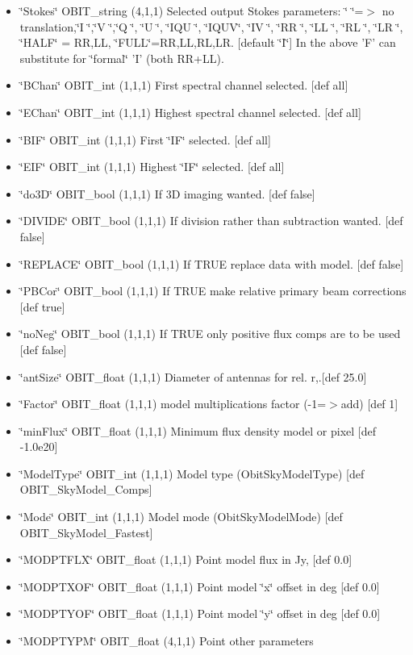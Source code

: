\begin{itemize}
\item \char`\"{}Stokes\char`\"{} OBIT\_\-string (4,1,1) Selected output Stokes parameters: \char`\"{}    \char`\"{}=$>$ no translation,\char`\"{}I   \char`\"{},\char`\"{}V   \char`\"{},\char`\"{}Q   \char`\"{}, \char`\"{}U   \char`\"{}, \char`\"{}IQU \char`\"{}, \char`\"{}IQUV\char`\"{}, \char`\"{}IV  \char`\"{}, \char`\"{}RR  \char`\"{}, \char`\"{}LL  \char`\"{}, \char`\"{}RL  \char`\"{}, \char`\"{}LR  \char`\"{}, \char`\"{}HALF\char`\"{} = RR,LL, \char`\"{}FULL\char`\"{}=RR,LL,RL,LR. [default \char`\"{}I\char`\"{}] In the above 'F' can substitute for \char`\"{}formal\char`\"{} 'I' (both RR+LL). \item \char`\"{}BChan\char`\"{} OBIT\_\-int (1,1,1) First spectral channel selected. [def all] \item \char`\"{}EChan\char`\"{} OBIT\_\-int (1,1,1) Highest spectral channel selected. [def all] \item \char`\"{}BIF\char`\"{} OBIT\_\-int (1,1,1) First \char`\"{}IF\char`\"{} selected. [def all] \item \char`\"{}EIF\char`\"{} OBIT\_\-int (1,1,1) Highest \char`\"{}IF\char`\"{} selected. [def all] \item \char`\"{}do3D\char`\"{} OBIT\_\-bool (1,1,1) If 3D imaging wanted. [def false] \item \char`\"{}DIVIDE\char`\"{} OBIT\_\-bool (1,1,1) If division rather than subtraction wanted. [def false] \item \char`\"{}REPLACE\char`\"{} OBIT\_\-bool (1,1,1) If TRUE replace data with model. [def false] \item \char`\"{}PBCor\char`\"{} OBIT\_\-bool (1,1,1) If TRUE make relative primary beam corrections [def true] \item \char`\"{}no\-Neg\char`\"{} OBIT\_\-bool (1,1,1) If TRUE only positive flux comps are to be used [def false] \item \char`\"{}ant\-Size\char`\"{} OBIT\_\-float (1,1,1) Diameter of antennas for rel. r,.[def 25.0] \item \char`\"{}Factor\char`\"{} OBIT\_\-float (1,1,1) model multiplications factor (-1=$>$add) [def 1] \item \char`\"{}min\-Flux\char`\"{} OBIT\_\-float (1,1,1) Minimum flux density model or pixel [def -1.0e20] \item \char`\"{}Model\-Type\char`\"{} OBIT\_\-int (1,1,1) Model type (Obit\-Sky\-Model\-Type) [def OBIT\_\-Sky\-Model\_\-Comps] \item \char`\"{}Mode\char`\"{} OBIT\_\-int (1,1,1) Model mode (Obit\-Sky\-Model\-Mode) [def OBIT\_\-Sky\-Model\_\-Fastest] \item \char`\"{}MODPTFLX\char`\"{} OBIT\_\-float (1,1,1) Point model flux in Jy, [def 0.0] \item \char`\"{}MODPTXOF\char`\"{} OBIT\_\-float (1,1,1) Point model \char`\"{}x\char`\"{} offset in deg [def 0.0] \item \char`\"{}MODPTYOF\char`\"{} OBIT\_\-float (1,1,1) Point model \char`\"{}y\char`\"{} offset in deg [def 0.0] \item \char`\"{}MODPTYPM\char`\"{} OBIT\_\-float (4,1,1) Point other parameters 
\end{itemize}

